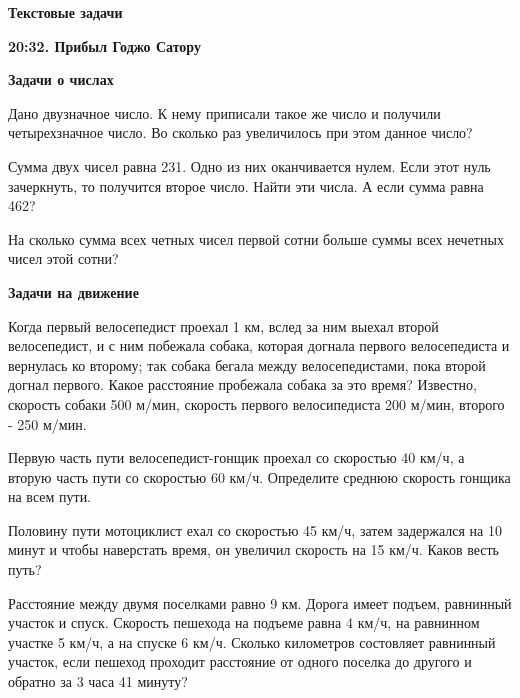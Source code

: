 \centerline{\bf \Huge Текстовые задачи}
\centerline{\bf \Huge }

\begin{flushright}
        \scriptsize{\textbf{20:32. Прибыл Годжо Сатору}}
\end{flushright}

\centerline{\bf \Huge Задачи о числах}

 Дано двузначное число. К нему приписали такое же число и получили четырехзначное число. Во сколько раз увеличилось при этом данное число?

 Сумма двух чисел равна 231. Одно из них оканчивается нулем. Если этот нуль зачеркнуть, то получится второе число. Найти эти числа. А если сумма равна 462?

 На сколько сумма всех четных чисел первой сотни больше суммы всех нечетных чисел этой сотни?

\centerline{\bf \Huge Задачи на движение}

 Когда первый велосепедист проехал 1 км, вслед за ним выехал второй велосепедист, и с ним побежала собака, которая догнала первого велосепедиста и вернулась ко второму; так собака бегала между велосепедистами, пока второй догнал первого. Какое расстояние пробежала собака за это время? Известно, скорость собаки 500 м/мин, скорость первого велосипедиста 200 м/мин, второго - 250 м/мин.

 Первую часть пути велосепедист-гонщик проехал со скоростью 40 км/ч, а вторую часть пути со скоростью 60 км/ч. Определите среднюю скорость гонщика на всем пути.

 Половину пути мотоциклист ехал со скоростью 45 км/ч, затем задержался на 10 минут и чтобы наверстать время, он увеличил скорость на 15 км/ч. Каков весть путь?

 Расстояние между двумя поселками равно 9 км. Дорога имеет подъем, равнинный участок и спуск. Скорость пешехода на подъеме равна 4 км/ч, на равнинном участке 5 км/ч, а на спуске 6 км/ч. Сколько километров состовляет равнинный участок, если пешеход проходит расстояние от одного поселка до другого и обратно за 3 часа 41 минуту?

